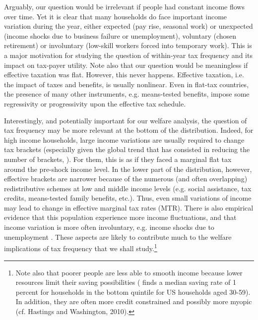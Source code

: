 Arguably, our question would be irrelevant if people had constant income flows
over time. Yet it is clear that many households do face important income
variation during the year, either expected (pay rise, seasonal work) or
unexpected (income shocks due to business failure or unemployment), voluntary
(chosen retirement) or involuntary (low-skill workers forced into temporary
work). This is a major motivation for studying the question of within-year tax
frequency and its impact on tax-payer utility. Note also that our question
would be meaningless if effective taxation was flat. However, this never
happens. Effective taxation, i.e. the impact of taxes and benefits, is usually
nonlinear. Even in flat-tax countries, the presence of many other instruments,
e.g. means-tested benefits, impose some regressivity or progressivity upon the
effective tax schedule.

Interestingly, and potentially important for our welfare analysis, the
question of tax frequency may be more relevant at the bottom of the
distribution. Indeed, for high income households, large income variations are
usually required to change tax brackets (especially given the global trend
that has consisted in reducing the number of brackets, \citet [Fig. 3,
p.468]{sabirianova_reform_of_pit}). For them, this is as if they faced a
marginal flat tax around the pre-shock income level. In the lower part of the
distribution, however, effective brackets are narrower because of the numerous
(and often overlapping) redistributive schemes at low and middle income levels
(e.g. social assistance, tax credits, means-tested family benefits, etc.).
Thus, even small variations of income may lead to change in effective marginal
tax rates (MTR). There is also empirical evidence that this population
experience more income fluctuations, and that income variation is more often
involuntary, e.g. income shocks due to unemployment \citep{Hills2006}. These
aspects are likely to contribute much to the welfare implications of tax
frequency that we shall study.\footnote{Note also that poorer people are less
able to smooth income because lower resources limit their saving possibilities
(\citet {dynan2004rich} finds a median saving rate of 1 percent for households
in the bottom quintile for US households aged 30-59). In addition, they are
often more credit constrained and possibly more myopic (cf. Hastings and
Washington, 2010).}\bigskip

